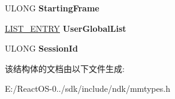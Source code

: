 \begin{DoxyCompactItemize}
\mbox{\label{struct___l_a_r_g_e___c_o_n_t_r_o_l___a_r_e_a_aa849be15ab0d2efc9125f2d0557e989d}} 
U\+L\+O\+NG {\bfseries Starting\+Frame}
\item 
\mbox{\label{struct___l_a_r_g_e___c_o_n_t_r_o_l___a_r_e_a_ac4c0df7d45a4ca18b511cd015068abaf}} 
\hyperlink{struct___l_i_s_t___e_n_t_r_y}{L\+I\+S\+T\+\_\+\+E\+N\+T\+RY} {\bfseries User\+Global\+List}
\item 
\mbox{\label{struct___l_a_r_g_e___c_o_n_t_r_o_l___a_r_e_a_aa66daa1ff5bb7392e2dd30367bf478df}} 
U\+L\+O\+NG {\bfseries Session\+Id}
\end{DoxyCompactItemize}


该结构体的文档由以下文件生成\+:\begin{DoxyCompactItemize}
\item 
E\+:/\+React\+O\+S-\/0../sdk/include/ndk/mmtypes.\+h\end{DoxyCompactItemize}
